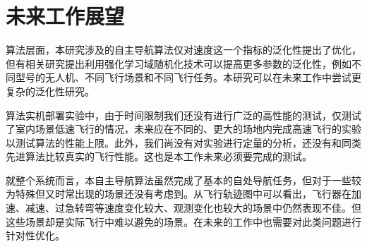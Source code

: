 \section{未来工作展望}

算法层面，本研究涉及的自主导航算法仅对速度这一个指标的泛化性提出了优化，但有相关研究提出利用强化学习域随机化技术可以提高更多参数的泛化性，例如不同型号的无人机、不同飞行场景和不同飞行任务。本研究可以在未来工作中尝试更复杂的泛化性研究。

算法实机部署实验中，由于时间限制我们还没有进行广泛的高性能的测试，仅测试了室内场景低速飞行的情况，未来应在不同的、更大的场地内完成高速飞行的实验以测试算法的性能上限。此外，我们尚没有对实验进行定量的分析，还没有和同类先进算法比较真实的飞行性能。这也是本工作未来必须要完成的测试。

就整个系统而言，本自主导航算法虽然完成了基本的自处导航任务，但对于一些较为特殊但又时常出现的场景还没有考虑到。从飞行轨迹图中可以看出，飞行器在加速、减速、过急转弯等速度变化较大、观测变化也较大的场景中仍然表现不佳。但这些场景却是实际飞行中难以避免的场景。在未来的工作中也需要对此类问题进行针对性优化。